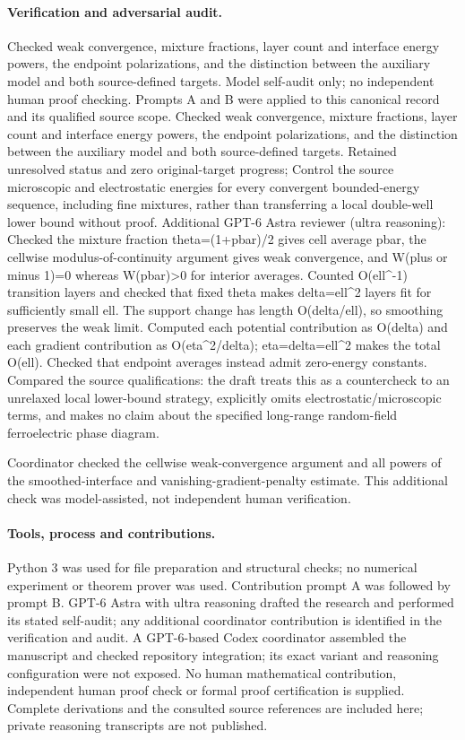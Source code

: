 \documentclass[11pt]{article}
\begin{document}
\paragraph{Verification and adversarial audit.}
Checked weak convergence, mixture fractions, layer count and interface energy powers, the endpoint polarizations, and the distinction between the auxiliary model and both source-defined targets. Model self-audit only; no independent human proof checking. Prompts A and B were applied to this canonical record and its qualified source scope. Checked weak convergence, mixture fractions, layer count and interface energy powers, the endpoint polarizations, and the distinction between the auxiliary model and both source-defined targets. Retained unresolved status and zero original-target progress; Control the source microscopic and electrostatic energies for every convergent bounded-energy sequence, including fine mixtures, rather than transferring a local double-well lower bound without proof. Additional GPT-6 Astra reviewer (ultra reasoning): Checked the mixture fraction theta=(1+pbar)/2 gives cell average pbar, the cellwise modulus-of-continuity argument gives weak convergence, and W(plus or minus 1)=0 whereas W(pbar)>0 for interior averages. Counted O(ell\textasciicircum{}-1) transition layers and checked that fixed theta makes delta=ell\textasciicircum{}2 layers fit for sufficiently small ell. The support change has length O(delta/ell), so smoothing preserves the weak limit. Computed each potential contribution as O(delta) and each gradient contribution as O(eta\textasciicircum{}2/delta); eta=delta=ell\textasciicircum{}2 makes the total O(ell). Checked that endpoint averages instead admit zero-energy constants. Compared the source qualifications: the draft treats this as a countercheck to an unrelaxed local lower-bound strategy, explicitly omits electrostatic/microscopic terms, and makes no claim about the specified long-range random-field ferroelectric phase diagram.

Coordinator checked the cellwise weak-convergence argument and all powers of the smoothed-interface and vanishing-gradient-penalty estimate. This additional check was model-assisted, not independent human verification.

\paragraph{Tools, process and contributions.}
Python 3 was used for file preparation and structural checks; no numerical experiment or theorem prover was used. Contribution prompt A was followed by prompt B. GPT-6 Astra with ultra reasoning drafted the research and performed its stated self-audit; any additional coordinator contribution is identified in the verification and audit. A GPT-6-based Codex coordinator assembled the manuscript and checked repository integration; its exact variant and reasoning configuration were not exposed. No human mathematical contribution, independent human proof check or formal proof certification is supplied. Complete derivations and the consulted source references are included here; private reasoning transcripts are not published.
\end{document}
